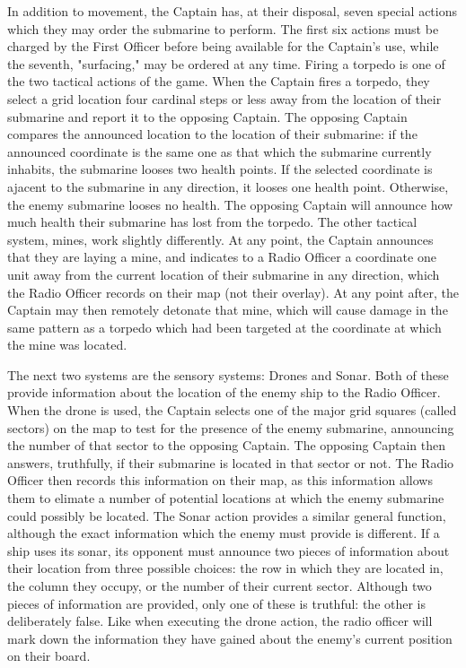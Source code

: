 
In addition to movement, the Captain has, at their disposal, seven special actions which they may order the submarine to perform. The first six actions must be charged by the First Officer before being available for the Captain's use, while the seventh, "surfacing," may be ordered at any time. Firing a torpedo is one of the two tactical actions of the game. When the Captain fires a torpedo, they select a grid location four cardinal steps or less away from the location of their submarine and report it to the opposing Captain. The opposing Captain compares the announced location to the location of their submarine: if the announced coordinate is the same one as that which the submarine currently inhabits, the submarine looses two health points. If the selected coordinate is ajacent to the submarine in any direction, it looses one health point. Otherwise, the enemy submarine looses no health. The opposing Captain will announce how much health their submarine has lost from the torpedo. The other tactical system, mines, work slightly differently. At any point, the Captain announces that they are laying a mine, and indicates to a Radio Officer a coordinate one unit away from the current location of their submarine in any direction, which the Radio Officer records on their map (not their overlay). At any point after, the Captain may then remotely detonate that mine, which will cause damage in the same pattern as a torpedo which had been targeted at the coordinate at which the mine was located. 

The next two systems are the sensory systems: Drones and Sonar. Both of these provide information about the location of the enemy ship to the Radio Officer. When the drone is used, the Captain selects one of the major grid squares (called sectors) on the map to test for the presence of the enemy submarine, announcing the number of that sector to the opposing Captain. The opposing Captain then answers, truthfully, if their submarine is located in that sector or not. The Radio Officer then records this information on their map, as this information allows them to elimate a number of potential locations at which the enemy submarine could possibly be located. The Sonar action provides a similar general function, although the exact information which the enemy must provide is different. If a ship uses its sonar, its opponent must announce two pieces of information about their location from three possible choices: the row in which they are located in, the column they occupy, or the number of their current sector. Although two pieces of information are provided, only one of these is truthful: the other is deliberately false. Like when executing the drone action, the radio officer will mark down the information they have gained about the enemy's current position on their board.

